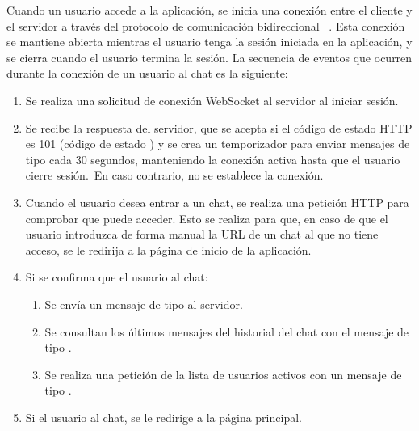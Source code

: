 
Cuando un usuario accede a la aplicación, se inicia una conexión entre el cliente y el servidor a través
del protocolo de comunicación bidireccional ~\cite{RFCWebSocket}.
Esta conexión se mantiene abierta mientras el usuario tenga la sesión iniciada en la aplicación, y se cierra cuando
el usuario termina la sesión.
La secuencia de eventos que ocurren durante la conexión de un usuario al chat es la siguiente:


\begin{enumerate}
	\item Se realiza una solicitud de conexión WebSocket al servidor al iniciar sesión.
	\item Se recibe la respuesta del servidor, que se acepta si el código de estado HTTP es 101 (código de estado
	) y se crea un temporizador para enviar mensajes de tipo 
	cada 30 segundos, manteniendo la conexión activa hasta que el usuario cierre sesión.\ En caso contrario, no se
	establece la conexión.
	\item Cuando el usuario desea entrar a un chat, se realiza una petición HTTP para comprobar que puede acceder.
	Esto se realiza para
	que, en caso de que el usuario introduzca de forma manual la URL de un chat al que no tiene acceso, se le redirija
	a la página de inicio de la aplicación.
	\item Si se confirma que el usuario  al chat:
	\begin{enumerate}
		\item Se envía un mensaje de tipo  al servidor.
		\item Se consultan los últimos mensajes del historial del chat con el mensaje de tipo
		.
		\item Se realiza una petición de la lista de usuarios activos con un mensaje de tipo
		.
	\end{enumerate}
	\item Si el usuario  al chat, se le redirige a la página principal.
\end{enumerate}
\label{itm:frontend-connection-life-cycle}


